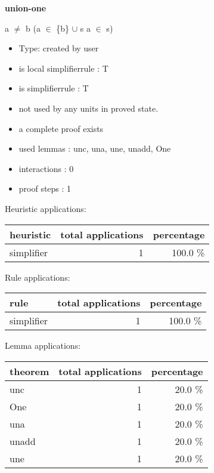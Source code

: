 \documentclass[a4paper]{article}
\begin{document}
{\LARGE\bf union-one}\label{lemma-union-one}

\medskip

 \Fol a $\neq$ b \Imp (a $\in$ \{b\} $\cup$ s \Equiv a $\in$ s)

\begin{itemize}

\item Type: created by user

\item is local simplifierrule : T
\item is simplifierrule : T
\item not used by any units in proved state.
\item       a complete proof exists
\item       used lemmas  : unc, una, une, unadd, One
\item       interactions : 0
\item       proof steps  : 1
\end{itemize}

\medskip


Heuristic applications:

\begin{supertabular}{l|r|r}
heuristic	& total applications & percentage \\ \hline
simplifier & 1 & 100.0 \% \\

\end{supertabular}

Rule applications:

\begin{supertabular}{l|r|r}
rule	        & total applications & percentage \\ \hline
simplifier & 1 & 100.0 \% \\

\end{supertabular}

Lemma applications:

\begin{supertabular}{l|r|r}
theorem	        & total applications & percentage \\ \hline
unc & 1 & 20.0 \% \\
One & 1 & 20.0 \% \\
una & 1 & 20.0 \% \\
unadd & 1 & 20.0 \% \\
une & 1 & 20.0 \% \\

\end{supertabular}
\pagebreak
\end{document}
